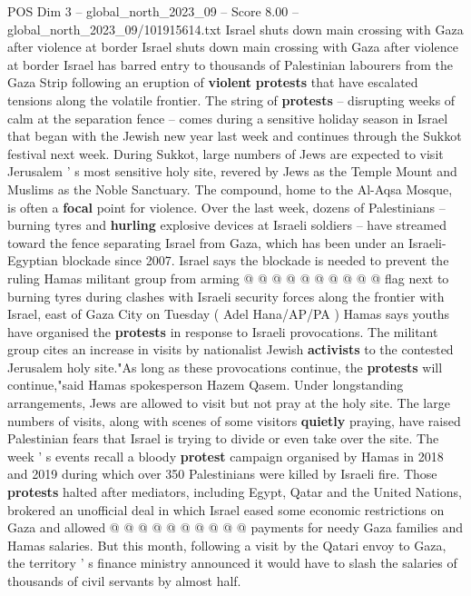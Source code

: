 \begin{textsample}{POS Dim 3 – global\_north\_2023\_09 – Score 8.00 – global\_north\_2023\_09/101915614.txt}  \label{ex:f3_pos_042}
Israel shuts down main crossing with Gaza after violence at border Israel shuts down main crossing with Gaza after violence at border Israel has barred entry to thousands of Palestinian labourers from the Gaza Strip following an eruption of \textbf{violent} \textbf{protests} that have escalated tensions along the volatile frontier.
The string of \textbf{protests} -- disrupting weeks of calm at the separation fence -- comes during a sensitive holiday season in Israel that began with the Jewish new year last week and continues through the Sukkot festival next week.
During Sukkot, large numbers of Jews are expected to visit Jerusalem ' s most sensitive holy site, revered by Jews as the Temple Mount and Muslims as the Noble Sanctuary.
The compound, home to the Al-Aqsa Mosque, is often a \textbf{focal} point for violence.
Over the last week, dozens of Palestinians -- burning tyres and \textbf{hurling} explosive devices at Israeli soldiers -- have streamed toward the fence separating Israel from Gaza, which has been under an Israeli-Egyptian blockade since 2007.
Israel says the blockade is needed to prevent the ruling Hamas militant group from arming @ @ @ @ @ @ @ @ @ @ flag next to burning tyres during clashes with Israeli security forces along the frontier with Israel, east of Gaza City on Tuesday ( Adel Hana/AP/PA ) Hamas says youths have organised the \textbf{protests} in response to Israeli provocations.
The militant group cites an increase in visits by nationalist Jewish \textbf{activists} to the contested Jerusalem holy site."As long as these provocations continue, the \textbf{protests} will continue,"said Hamas spokesperson Hazem Qasem.
Under longstanding arrangements, Jews are allowed to visit but not pray at the holy site.
The large numbers of visits, along with scenes of some visitors \textbf{quietly} praying, have raised Palestinian fears that Israel is trying to divide or even take over the site.
The week ' s events recall a bloody \textbf{protest} campaign organised by Hamas in 2018 and 2019 during which over 350 Palestinians were killed by Israeli fire.
Those \textbf{protests} halted after mediators, including Egypt, Qatar and the United Nations, brokered an unofficial deal in which Israel eased some economic restrictions on Gaza and allowed @ @ @ @ @ @ @ @ @ @ payments for needy Gaza families and Hamas salaries.
But this month, following a visit by the Qatari envoy to Gaza, the territory ' s finance ministry announced it would have to slash the salaries of thousands of civil servants by almost half.

\end{textsample}
